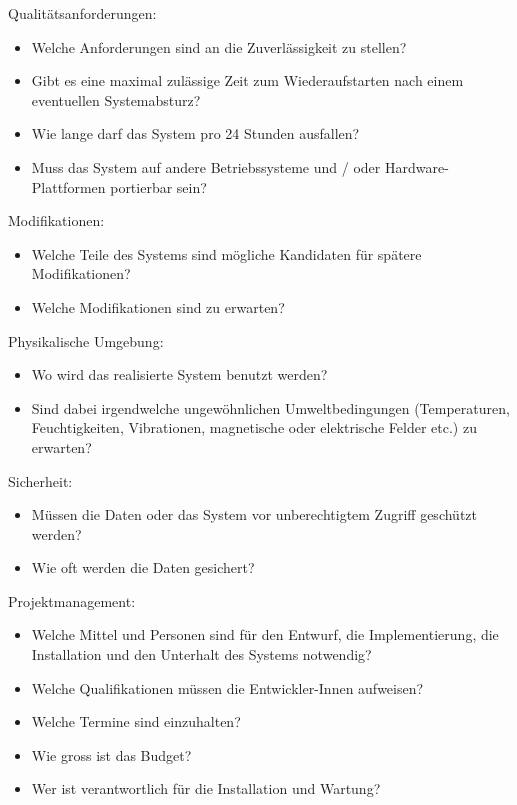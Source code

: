 \ifslides
\else
\newpage
\fi
Qualit\"atsanforderungen:
\begin{itemize}
\item Welche Anforderungen sind an die Zuverl\"assigkeit zu stellen?
\item Gibt es eine maximal zul\"assige Zeit zum Wiederaufstarten nach einem
eventuellen Systemabsturz?
\item Wie lange darf das System pro 24 Stunden ausfallen?
\item Muss das System auf andere Betriebssysteme und / oder 
Hardware-Plattformen portierbar sein?
\end{itemize}
\ifslides
\newpage
\fi
Modifikationen:
\begin{itemize}
\item Welche Teile des Systems sind m\"ogliche Kandidaten f\"ur 
sp\"atere Modifikationen?
\item Welche Modifikationen sind zu erwarten?
\end{itemize}
Physikalische Umgebung:
\begin{itemize}
\item Wo wird das realisierte System benutzt werden?
\item Sind dabei irgendwelche ungew\"ohnlichen Umweltbedingungen
 (Temperaturen, Feuchtigkeiten, Vibrationen, magnetische oder
 elektrische Felder etc.) zu erwarten?
\end{itemize}
Sicherheit:
\begin{itemize}
\item M\"ussen die Daten oder das System vor unberechtigtem
Zugriff gesch\"utzt werden?
\item Wie oft werden die Daten gesichert?
\end{itemize}
\ifslides
\newpage
\fi
Projektmanagement:
\begin{itemize}
\item Welche Mittel und Personen sind f\"ur den Entwurf, die Implementierung,
die Installation und den Unterhalt des Systems notwendig?
\item Welche Qualifikationen m\"ussen die Entwickler-Innen aufweisen?
\item Welche Termine sind einzuhalten?
\item Wie gross ist das Budget?
\item Wer ist verantwortlich f\"ur die Installation und Wartung?
\end{itemize}
\newpage
